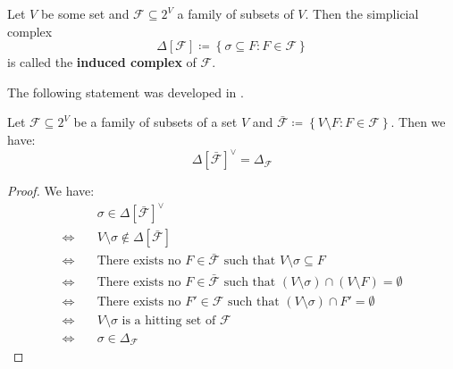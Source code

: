 \begin{defi}
Let \(V\) be some set and \(\mathcal{F}\subseteq 2^V\) a family of subsets of \(V\). Then the simplicial complex
\[
\Delta\left[\mathcal{F}\right]\coloneqq \left\{\sigma\subseteq F:F\in\mathcal{F}\right\}
\]
is called the \textbf{induced complex} of \(\mathcal{F}\). 
\end{defi}

The following statement was developed in \cite{9}.

\begin{prop}\label{proposition13}
Let \(\mathcal{F}\subseteq 2^V\) be a family of subsets of a set \(V\) and \(\bar{\mathcal{F}}\coloneqq \left\{V\setminus F:F\in\mathcal{F}\right\}\). Then we have:
\[
\Delta\left[\bar{\mathcal{F}}\right]^{\lor}=\Delta_{\mathcal{F}}
\]
\begin{proof}
We have:
\begin{align*}
  & \sigma\in\Delta\left[\bar{\mathcal{F}}\right]^{\lor} \\
  \Longleftrightarrow \quad & V\setminus\sigma\notin\Delta\left[\bar{\mathcal{F}}\right] \\
  \Longleftrightarrow \quad & \text{There exists no } F\in\bar{\mathcal{F}}\text{ such that }V\setminus\sigma\subseteq F \\
  \Longleftrightarrow \quad & \text{There exists no } F\in\bar{\mathcal{F}}\text{ such that }(V\setminus\sigma)\cap(V\setminus F)=\emptyset \\
  \Longleftrightarrow \quad & \text{There exists no } F'\in\mathcal{F}\text{ such that }(V\setminus\sigma)\cap F'=\emptyset \\
  \Longleftrightarrow \quad & V\setminus\sigma\text{ is a hitting set of }\mathcal{F} \\
  \Longleftrightarrow \quad & \sigma\in\Delta_{\mathcal{F}}
 \end{align*}
\end{proof}
\end{prop}


